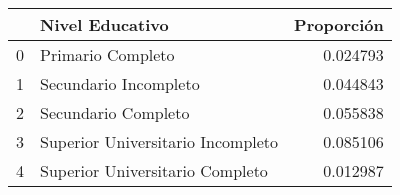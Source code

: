 \begin{tabular}{llr}
\toprule
 & Nivel Educativo & Proporción \\
\midrule
0 & Primario Completo & 0.024793 \\
1 & Secundario Incompleto & 0.044843 \\
2 & Secundario Completo & 0.055838 \\
3 & Superior Universitario Incompleto & 0.085106 \\
4 & Superior Universitario Completo & 0.012987 \\
\bottomrule
\end{tabular}
